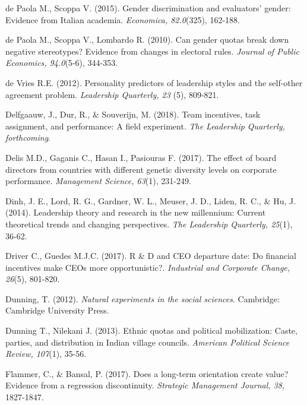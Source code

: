 \documentclass[english]{article}
\begin{document}
\begin{singlespace}
\begin{list}{}{\setlength\itemindent{-\leftmargin}}
\item *de Paola M., Scoppa V. (2015). Gender discrimination and evaluators' gender: Evidence from Italian academia. \emph{Economica, 82.0}(325), 162-188.

\item *de Paola M., Scoppa V., Lombardo R. (2010). Can gender quotas break down negative stereotypes? Evidence from changes in electoral rules.  \emph{Journal of Public Economics, 94.0}(5-6), 344-353.

\item de Vries R.E. (2012). Personality predictors of leadership styles and the self-other agreement problem. \emph{Leadership Quarterly, 23} (5), 809-821.

\item Delfgaauw, J., Dur, R., \& Souverijn, M. (2018). Team incentives, task assignment, and performance: A field experiment. \emph{The Leadership Quarterly, forthcoming}.

\item *Delis M.D., Gaganis C., Hasan I., Pasiouras F. (2017). The effect of board directors from countries with different genetic diversity levels on corporate performance. \emph{Management Science, 63}(1), 231-249.

\item Dinh, J. E., Lord, R. G., Gardner, W. L., Meuser, J. D., Liden, R. C., \& Hu, J. (2014). Leadership theory and research in the new millennium: Current theoretical trends and changing perspectives. \emph{The Leadership Quarterly, 25}(1), 36-62.

\item *Driver C., Guedes M.J.C. (2017). R \& D and CEO departure date: Do financial incentives make CEOs more opportunistic?. \emph{Industrial and Corporate Change, 26}(5), 801-820.

\item Dunning, T. (2012). \emph{Natural experiments in the social sciences}.  Cambridge: Cambridge University Press.

\item *Dunning T., Nilekani J. (2013). Ethnic quotas and political mobilization: Caste, parties, and distribution in Indian village councils. \emph{American Political Science Review, 107}(1), 35-56.

\item Flammer, C., \& Bansal, P. (2017). Does a long-term orientation create value? Evidence from a regression discontinuity. \emph{Strategic Management Journal, 38}, 1827-1847.


\end{list}
\end{singlespace}
\end{document}
